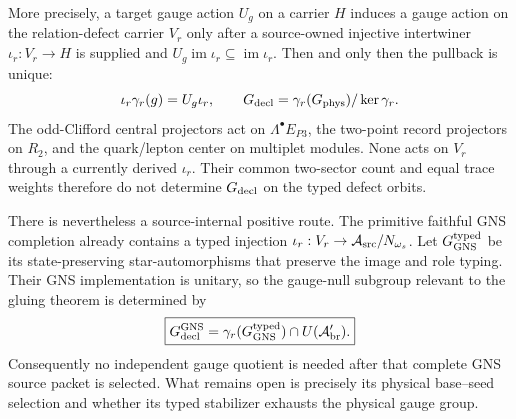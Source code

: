 More precisely, a target gauge action $U_g$ on a carrier $H$ induces a gauge
action on the relation-defect carrier $V_r$ only after a source-owned
injective intertwiner $\iota_r:V_r\to H$ is supplied and
$U_g\operatorname{im}\iota_r\subseteq\operatorname{im}\iota_r$.  Then and
only then the pullback is unique:
\begin{equation}
\iota_r\gamma_r(g)=U_g\iota_r,
\qquad
G_{\rm decl}=\gamma_r(G_{\rm phys})/\ker\gamma_r.
\label{eq:gaugepullback}
\end{equation}
The odd-Clifford central projectors act on $\Lambda^\bullet E_{P3}$, the
two-point record projectors on $R_2$, and the quark/lepton center on multiplet
modules.  None acts on $V_r$ through a currently derived $\iota_r$.  Their
common two-sector count and equal trace weights therefore do not determine
$G_{\rm decl}$ on the typed defect orbits.

There is nevertheless a source-internal positive route.  The primitive
faithful GNS completion already contains a typed injection
$\iota_r:V_r\to\mathcal A_{\rm src}/N_{\omega_s}$.  Let
$G_{\rm GNS}^{\rm typed}$ be its state-preserving star-automorphisms that
preserve the image and role typing.  Their GNS implementation is unitary, so
the gauge-null subgroup relevant to the gluing theorem is determined by
\begin{equation}
\boxed{
G_{\rm decl}^{\rm GNS}
=\gamma_r(G_{\rm GNS}^{\rm typed})\cap U(\mathcal A_{\rm br}').}
\label{eq:gnsgaugecandidate}
\end{equation}
Consequently no independent gauge quotient is needed after that complete GNS
source packet is selected.  What remains open is precisely its physical
base--seed selection and whether its typed stabilizer exhausts the physical
gauge group.

